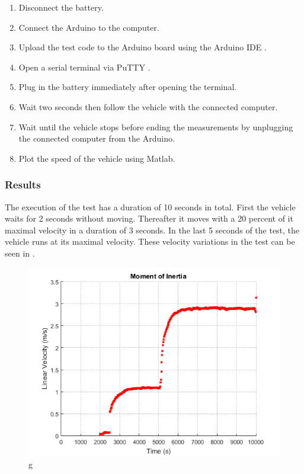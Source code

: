 \begin{enumerate}
  \item Disconnect the battery.
  \item Connect the Arduino to the computer.
  \item Upload the test code to the Arduino board using the Arduino IDE  \cite{ArduinoIDE}.
  \item Open a serial terminal via PuTTY \cite{PuTTY}.
  \item Plug in the battery immediately after opening the terminal.
  \item Wait two seconds then follow the vehicle with the connected computer.
  \item Wait until the vehicle stops before ending the measurements by unplugging the connected computer from the Arduino.
  \item Plot the speed of the vehicle using Matlab.
\end{enumerate}

\subsubsection{Results} \label{inertiaTestResults}
The execution of the test has a duration of 10 seconds in total. First the vehicle waits for 2 seconds without moving. Thereafter it moves with a 20 percent of it maximal velocity in a duration of 3 seconds. In the last 5 seconds of the test, the vehicle runs at its maximal velocity. These velocity variations in the test can be seen in .

\begin{figure}[H]
  \centering
  \includegraphics[scale=0.8]{figures/VehicleMomentOfInertiaTest.png}
  \caption{g}
  \label{MomentOfInertiaTestPlot}
\end{figure}




